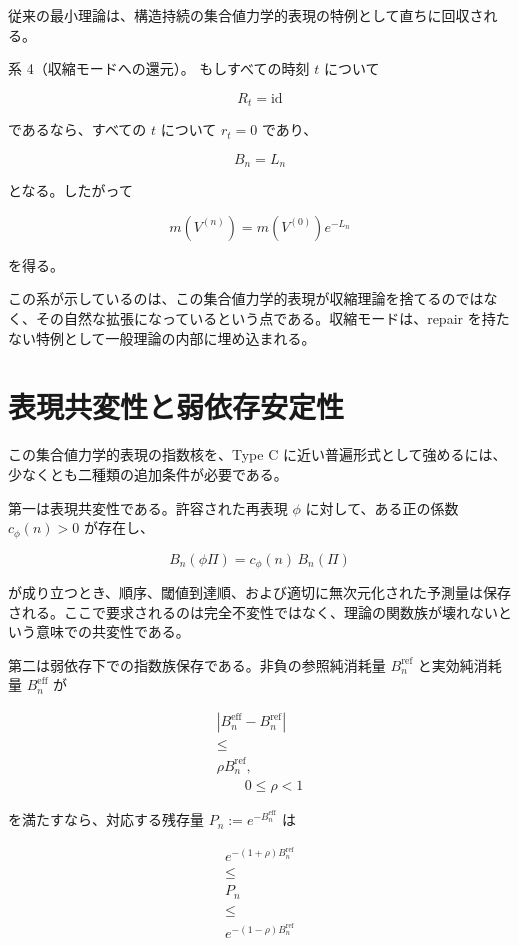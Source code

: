 \documentclass[12pt,a4paper]{article}
\begin{document}
従来の最小理論は、構造持続の集合値力学的表現の特例として直ちに回収される。

系 4（収縮モードへの還元）。 もしすべての時刻 \(t\) について

\[
R_{t} = \mathrm{id}
\]

であるなら、すべての \(t\) について \(r_{t} = 0\) であり、

\[
B_{n} = L_{n}
\]

となる。したがって

\[
m(V^{(n)}) = m(V^{(0)}) e^{-L_{n}}
\]

を得る。

この系が示しているのは、この集合値力学的表現が収縮理論を捨てるのではなく、その自然な拡張になっているという点である。収縮モードは、repair を持たない特例として一般理論の内部に埋め込まれる。

\section{表現共変性と弱依存安定性}\label{ux8868ux73feux5171ux5909ux6027ux3068ux5f31ux4f9dux5b58ux5b89ux5b9aux6027}

この集合値力学的表現の指数核を、Type C に近い普遍形式として強めるには、少なくとも二種類の追加条件が必要である。

第一は表現共変性である。許容された再表現 \(\phi\) に対して、ある正の係数 \(c_\phi(n) > 0\) が存在し、

\[
B_{n}(\phi \Pi) = c_\phi(n)\, B_{n}(\Pi)
\]

が成り立つとき、順序、閾値到達順、および適切に無次元化された予測量は保存される。ここで要求されるのは完全不変性ではなく、理論の関数族が壊れないという意味での共変性である。

第二は弱依存下での指数族保存である。非負の参照純消耗量 \(B_{n}^{\mathrm{ref}}\) と実効純消耗量 \(B_{n}^{\mathrm{eff}}\) が

\[
\begin{aligned}
|B_{n}^{\mathrm{eff}} - B_{n}^{\mathrm{ref}}| \\
\le \\
\rho B_{n}^{\mathrm{ref}}, \\
\qquad 0 \le \rho < 1
\end{aligned}
\]

を満たすなら、対応する残存量 \(P_{n} := e^{-B_{n}^{\mathrm{eff}}}\) は

\[
\begin{aligned}
e^{-(1+\rho)B_{n}^{\mathrm{ref}}} \\
\le \\
P_{n} \\
\le \\
e^{-(1-\rho)B_{n}^{\mathrm{ref}}}
\end{aligned}
\]
\end{document}
